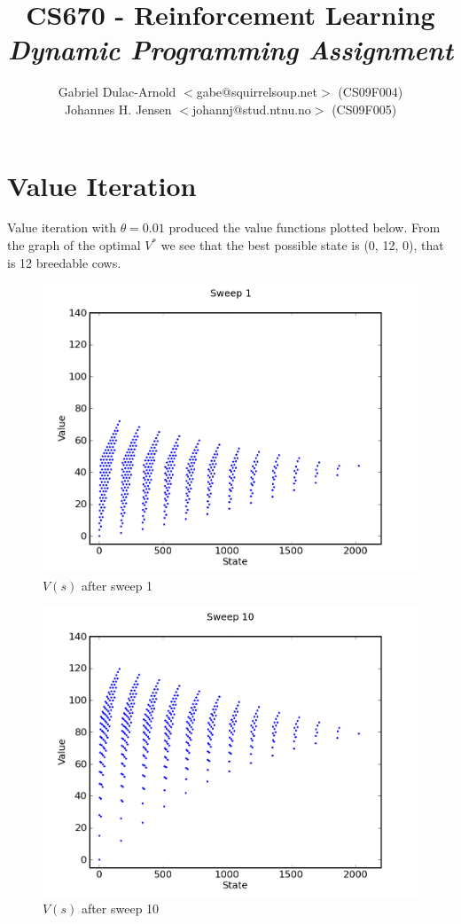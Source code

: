 \documentclass[a4paper]{article}
\author{Gabriel Dulac-Arnold $<$gabe@squirrelsoup.net$>$ (CS09F004) \\
Johannes H. Jensen $<$johannj@stud.ntnu.no$>$ (CS09F005)}
\title{CS670 - Reinforcement Learning \\
\emph{Dynamic Programming Assignment}}
\begin{document}
\setlength{\parskip}{2ex}
\maketitle

\section{Value Iteration}

Value iteration with $\theta=0.01$ produced the value functions plotted below. From the graph of the optimal $V^*$ we see that the best possible state is (0, 12, 0), that is 12 breedable cows.

\begin{figure}[ht]
\center
\includegraphics[scale=0.8]{value_iteration/sweep_1.png}
\caption{$V(s)$ after sweep 1}
\end{figure}

\begin{figure}[ht]
\center
\includegraphics[scale=0.8]{value_iteration/sweep_10.png}
\caption{$V(s)$ after sweep 10}
\end{figure}
\end{document}
